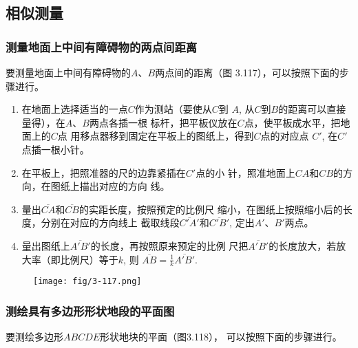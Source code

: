 \subsection{相似测量}
\subsubsection{测量地面上中间有障碍物的两点间距离}
要测量地面上中间有障碍物的$A$、$B$两点间的距离（图
3.117），可以按照下面的步骤进行。

\begin{enumerate}
    \item 在地面上选择适当的一点$C$作为测站（要使从$C$到
$A$, 从$C$到$B$的距离可以直接量得），在$A$、$B$两点各插一根
标杆，把平板仪放在$C$点，使平板成水平，把地面上的$C$点
用移点器移到固定在平板上的图纸上，得到$C$点的对应点
$C'$, 在$C'$点插一根小针。
\item 在平板上，把照准器的尺的边靠紧插在$C'$点的小
针，照准地面上$CA$和$CB$的方向，在图纸上描出对应的方向
线。
\item 量出$\overline{CA}$和$\overline{CB}$的实距长度，按照预定的比例尺
缩小，在图纸上按照缩小后的长度，分别在对应的方向线上
截取线段$\overline{C'A'}$和$\overline{C'B'}$, 定出$A'$、$B'$两点。
\item 量出图纸上$\overline{A'B'}$的长度，再按照原来预定的比例
尺把$\overline{A'B'}$的长度放大，若放大率（即比例尺）等于$k$, 则
$\overline{AB}=\frac{1}{k}\overline{A'B'}$.
\end{enumerate}

\begin{figure}[htp]
    \centering
\texttt{[image: fig/3-117.png]}
    \caption{}
\end{figure}

\subsubsection{测绘具有多边形形状地段的平面图}
要测绘多边形$ABCDE$形状地块的平面（图3.118），
可以按照下面的步骤进行。

\begin{figure}[htp]
    \centering
{}
    \caption{}
\end{figure}


